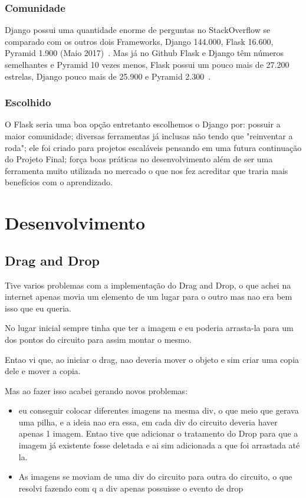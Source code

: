 \documentclass[a4paper, 12pt, oneside]{book}
\begin{document}
\subsection{Comunidade}
Django possui uma quantidade enorme de perguntas no StackOverflow se comparado com os outros dois Frameworks, Django 144.000, Flask 16.600, Pyramid 1.900 (Maio 2017)~\cite{stackoverflowtags}. Mas já no Github Flask e Django têm números semelhantes e Pyramid 10 vezes menos, Flask possui um pouco mais de 27.200 estrelas, Django pouco mais de 25.900 e Pyramid 2.300~\cite{github}.

\subsection{Escolhido}
O Flask seria uma boa opção entretanto escolhemos o Django por: possuir a maior comunidade; diversas ferramentas já inclusas não tendo que "reinventar a roda"; ele foi criado para projetos escaláveis pensando em uma futura continuação do Projeto Final; força boas práticas no desenvolvimento além de ser uma ferramenta muito utilizada no mercado o que nos fez acreditar que traria mais benefícios com o aprendizado.

\chapter{Desenvolvimento}
\thispagestyle{empty} 

\section{Drag and Drop}

Tive varios problemas com a implementação do Drag and Drop, o que achei na internet apenas movia um elemento de um lugar para o outro mas nao era bem isso que eu queria.

No lugar inicial sempre tinha que ter a imagem e eu poderia arrasta-la para um dos pontos do circuito para assim montar o mesmo.

Entao vi que, ao iniciar o drag, nao deveria mover o objeto e sim criar uma copia dele e mover a copia.

Mas ao fazer isso acabei gerando novos problemas: 
\begin{itemize}
\item eu conseguir colocar diferentes imagens na mesma div, o que meio que gerava uma pilha, e a ideia nao era essa, em cada div do circuito deveria haver apenas 1 imagem. Entao tive que adicionar o tratamento do Drop para que a imagem já existente fosse deletada e ai sim adicionada a que foi arrastada até la.
\item As imagens se moviam de uma div do circuito para outra do circuito, o que resolvi fazendo com q a div apenas possuisse o evento de drop
\end{itemize}
	
\end{document}
